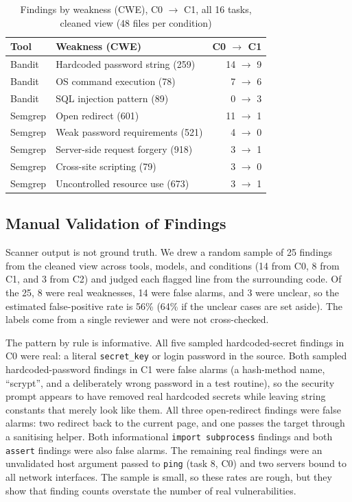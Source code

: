\documentclass[conference]{IEEEtran}
\begin{document}
\begin{table}[t]
\caption{Findings by weakness (CWE), C0 $\rightarrow$ C1, all 16 tasks, cleaned view (48 files per condition)}
\label{tab:cwe}
\centering
\footnotesize
\begin{tabular}{@{}llr@{}}
\toprule
Tool & Weakness (CWE) & C0 $\rightarrow$ C1 \\
\midrule
Bandit & Hardcoded password string (259) & 14 $\rightarrow$ 9 \\
Bandit & OS command execution (78) & 7 $\rightarrow$ 6 \\
Bandit & SQL injection pattern (89) & 0 $\rightarrow$ 3 \\
Semgrep & Open redirect (601) & 11 $\rightarrow$ 1 \\
Semgrep & Weak password requirements (521) & 4 $\rightarrow$ 0 \\
Semgrep & Server-side request forgery (918) & 3 $\rightarrow$ 1 \\
Semgrep & Cross-site scripting (79) & 3 $\rightarrow$ 0 \\
Semgrep & Uncontrolled resource use (673) & 3 $\rightarrow$ 1 \\
\bottomrule
\end{tabular}
\end{table}

\subsection{Manual Validation of Findings}
Scanner output is not ground truth. We drew a random sample of 25 findings from the cleaned view across tools, models, and conditions (14 from C0, 8 from C1, and 3 from C2) and judged each flagged line from the surrounding code. Of the 25, 8 were real weaknesses, 14 were false alarms, and 3 were unclear, so the estimated false-positive rate is 56\% (64\% if the unclear cases are set aside). The labels come from a single reviewer and were not cross-checked.

The pattern by rule is informative. All five sampled hardcoded-secret findings in C0 were real: a literal \texttt{secret\_key} or login password in the source. Both sampled hardcoded-password findings in C1 were false alarms (a hash-method name, ``scrypt'', and a deliberately wrong password in a test routine), so the security prompt appears to have removed real hardcoded secrets while leaving string constants that merely look like them. All three open-redirect findings were false alarms: two redirect back to the current page, and one passes the target through a sanitising helper. Both informational \texttt{import subprocess} findings and both \texttt{assert} findings were also false alarms. The remaining real findings were an unvalidated host argument passed to \texttt{ping} (task 8, C0) and two servers bound to all network interfaces. The sample is small, so these rates are rough, but they show that finding counts overstate the number of real vulnerabilities.
\end{document}
